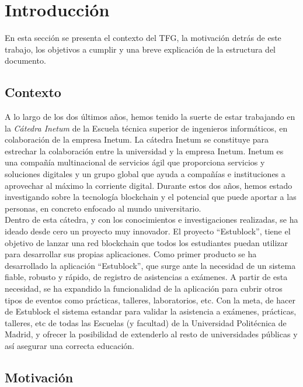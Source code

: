 \chapter{Introducción}
\label{cap:Introduccion}

En esta sección se presenta el contexto del TFG, la motivación detrás de este trabajo, los objetivos a cumplir y una breve explicación de la estructura del documento.

\section{Contexto}

A lo largo de los dos últimos años, hemos tenido la suerte de estar trabajando en la \emph{Cátedra Inetum} de la Escuela técnica superior de ingenieros informáticos, en colaboración de la empresa Inetum. La cátedra Inetum se constituye para estrechar la colaboración entre la universidad y la empresa Inetum. Inetum es una compañía multinacional de servicios ágil que proporciona servicios y soluciones digitales y un grupo global que ayuda a compañías e instituciones a aprovechar al máximo la corriente digital. Durante estos dos años, hemos estado investigando sobre la tecnología blockchain y el potencial que puede aportar a las personas, en concreto enfocado al mundo universitario. \\

Dentro de esta cátedra, y con los conocimientos e investigaciones realizadas, se ha ideado desde cero un proyecto muy innovador. El proyecto ``Estublock'', tiene el objetivo de lanzar una red blockchain que todos los estudiantes puedan utilizar para desarrollar sus propias aplicaciones. Como primer producto se ha desarrollado la aplicación ``Estublock'', que surge ante la necesidad de un sistema fiable, robusto y rápido, de registro de asistencias a exámenes. A partir de esta necesidad, se ha expandido la funcionalidad de la aplicación para cubrir otros tipos de eventos como prácticas, talleres, laboratorios, etc. Con la meta, de hacer de Estublock el sistema estandar para validar la asistencia a exámenes, prácticas, talleres, etc de todas las Escuelas (y facultad) de la Universidad Politécnica de Madrid, y ofrecer la posibilidad de extenderlo al resto de universidades públicas y así asegurar una correcta educación.

\section{Motivación}

